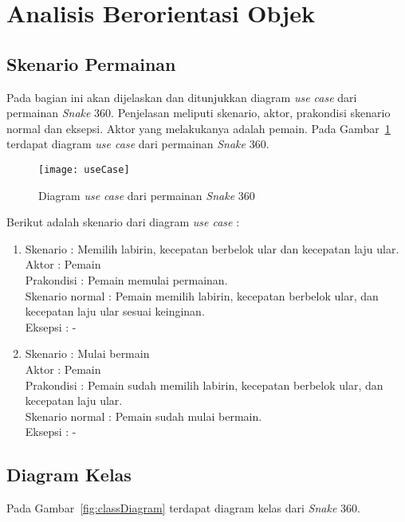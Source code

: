 \section{Analisis Berorientasi Objek}

\subsection{Skenario Permainan}
Pada bagian ini akan dijelaskan dan ditunjukkan diagram \textit{use case} dari permainan \textit{Snake} 360. Penjelasan meliputi skenario, aktor, prakondisi skenario normal dan eksepsi. Aktor yang melakukanya adalah pemain. Pada Gambar~\ref{fig:useCase} terdapat diagram \textit{use case} dari permainan \textit{Snake} 360.

\begin{figure}[H]
	\centering  
	\texttt{[image: useCase]}  
	\caption[Diagram \textit{use case} dari permainan \textit{Snake} 360]{Diagram \textit{use case} dari permainan \textit{Snake} 360}
	\label{fig:useCase} 
\end{figure}

Berikut adalah skenario dari diagram \textit{use case} :

\begin{enumerate}
	\item Skenario : Memilih labirin, kecepatan berbelok ular dan kecepatan laju ular. \\
Aktor : Pemain \\
Prakondisi : Pemain memulai permainan.\\
Skenario normal : Pemain memilih labirin, kecepatan berbelok ular, dan kecepatan laju ular sesuai keinginan. \\
Eksepsi : - \\

	\item Skenario : Mulai bermain \\
Aktor : Pemain \\
Prakondisi : Pemain sudah memilih labirin, kecepatan berbelok ular, dan kecepatan laju ular. \\
Skenario normal : Pemain sudah mulai bermain. \\ 
Eksepsi : - \\
\end{enumerate}

\subsection{Diagram Kelas}
Pada Gambar~\ref{fig:classDiagram} terdapat diagram kelas dari \textit{Snake} 360.

